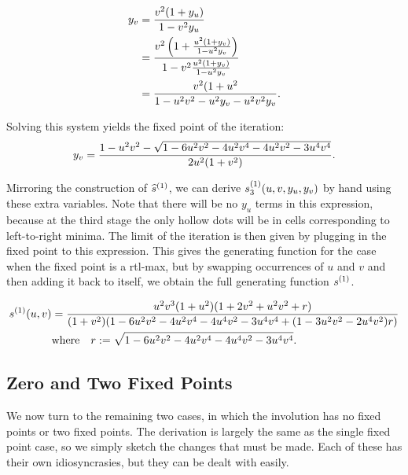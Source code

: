     $$ \begin{aligned} 
        y_v &=  \frac{v^2 (1 + y_u)}{1 - v^2 y_u} \\
        &= \frac{v^2 \left(1 + \frac{u^2 (1 + y_v)}{1 - u^2 y_v}\right)}{%
          1-v^2 \frac{u^2 (1 + y_v)}{1 - u^2 y_v}} \\
        &= \frac{v^2 (1 + u^2}{%
            1 - u^2v^2 - u^2y_v - u^2v^2y_v}. 
    \end{aligned} $$

    Solving this system yields the fixed point of the iteration: 
    \begin{equation} \label{involutions:eqn:dualfixed}
      y_v = \frac{1 - u^2v^2 - \sqrt{1 - 6u^2v^2 - 4u^2v^4 - 
                                     4u^2v^2 - 3u^4v^4}}{%
                  2u^2(1+v^2)}.
    \end{equation}

    Mirroring the construction of $\widehat{s}^{(1)}$, we can derive
    $s^{(1)}_3(u,v,y_u, y_v)$ by hand using these extra variables. Note that
    there will be no $y_u$ terms in this expression, because at the third stage
    the only hollow dots will be in cells corresponding to left-to-right
    minima. The limit of the iteration is then given by plugging in the fixed
    point to this expression. This gives the generating function for the case
    when the fixed point is a rtl-max, but by swapping occurrences of $u$ and
    $v$ and then adding it back to itself, we obtain the full generating
    function $s^{(1)}$. 

    {\small
    \begin{equation} \label{involutions:eqn:sone}
      \begin{split}
      s^{(1)}(u,v) &= 
        \frac{u^2v^3(1+u^2)(1+2v^2+u^2v^2+r)}
        {(1+v^2)(1-6u^2v^2-4u^2v^4-4u^4v^2-3u^4v^4+(1-3u^2v^2-2u^4v^2)r)}\\
        &\text{where} \quad r := \sqrt{1-6u^2v^2-4u^2v^4-4u^4v^2-3u^4v^4}.
      \end{split}
    \end{equation}
    }


  \subsection{Zero and Two Fixed Points}
  \label{involutions:sub:02fp}
    
    We now turn to the remaining two cases, in which the involution has no
    fixed points or two fixed points. The derivation is largely the same as the
    single fixed point case, so we simply sketch the changes that must be made. 
    Each of these has their own idiosyncrasies, but they can be dealt with
    easily. 


